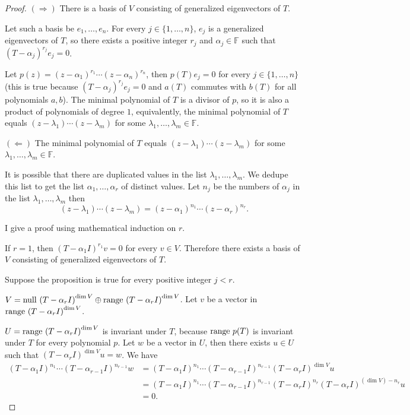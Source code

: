 \begin{proof}
    $(\Rightarrow)$ There is a basis of $V$ consisting of generalized eigenvectors of $T$.

    Let such a basis be $e_{1}, \ldots, e_{n}$. For every $j\in\{1,\ldots,n\}$, $e_{j}$ is a generalized eigenvectors of $T$, so there exists a positive integer $r_{j}$ and $\alpha_{j}\in\mathbb{F}$ such that ${(T - \alpha_{j})}^{r_{j}}e_{j} = 0$.

    Let $p(z) = {(z - \alpha_{1})}^{r_{1}}\cdots {(z - \alpha_{n})}^{r_{n}}$, then $p(T)e_{j} = 0$ for every $j\in\{ 1,\ldots, n \}$ (this is true because ${(T - \alpha_{j})}^{r_{j}}e_{j} = 0$ and $a(T)$ commutes with $b(T)$ for all polynomials $a, b$). The minimal polynomial of $T$ is a divisor of $p$, so it is also a product of polynomials of degree $1$, equivalently, the minimal polynomial of $T$ equals $(z - \lambda_{1})\cdots (z - \lambda_{m})$ for some $\lambda_{1}, \ldots, \lambda_{m}\in\mathbb{F}$.

    \bigskip
    $(\Leftarrow)$ The minimal polynomial of $T$ equals $(z - \lambda_{1})\cdots (z - \lambda_{m})$ for some $\lambda_{1}, \ldots, \lambda_{m}\in\mathbb{F}$.

    It is possible that there are duplicated values in the list $\lambda_{1}, \ldots, \lambda_{m}$. We dedupe this list to get the list $\alpha_{1}, \ldots, \alpha_{r}$ of distinct values. Let $n_{j}$ be the numbers of $\alpha_{j}$ in the list $\lambda_{1}, \ldots, \lambda_{m}$ then
    \[
        (z - \lambda_{1})\cdots (z - \lambda_{m}) = {(z - \alpha_{1})}^{n_{1}}\cdots {(z - \alpha_{r})}^{n_{r}}.
    \]

    I give a proof using mathematical induction on $r$.

    If $r = 1$, then ${(T - \alpha_{1}I)}^{r_{1}}v = 0$ for every $v\in V$. Therefore there exists a basis of $V$ consisting of generalized eigenvectors of $T$.

    Suppose the proposition is true for every positive integer $j < r$.

    $V = \operatorname{null}\,{{(T - \alpha_{r}I)}^{\dim V}}\oplus \operatorname{range}\,{{(T - \alpha_{r}I)}^{\dim V}}$. Let $v$ be a vector in $\operatorname{range}\,{{(T - \alpha_{r}I)}^{\dim V}}$.

    $U = \operatorname{range}\,{{(T - \alpha_{r}I)}^{\dim V}}$ is invariant under $T$, because $\operatorname{range}\,{p(T)}$ is invariant under $T$ for every polynomial $p$. Let $w$ be a vector in $U$, then there exists $u\in U$ such that ${(T - \alpha_{r}I)}^{\dim V}u = w$. We have
    \begin{align*}
        {(T - \alpha_{1}I)}^{n_{1}}\cdots {(T - \alpha_{r-1}I)}^{n_{r-1}}w & = {(T - \alpha_{1}I)}^{n_{1}}\cdots {(T - \alpha_{r-1}I)}^{n_{r-1}}{(T - \alpha_{r}I)}^{\dim V}u                                      \\
                                                                           & = {(T - \alpha_{1}I)}^{n_{1}}\cdots {(T - \alpha_{r-1}I)}^{n_{r-1}}{(T - \alpha_{r}I)}^{n_{r}}{(T - \alpha_{r}I)}^{(\dim V) - n_{r}}u \\
                                                                           & = 0.
    \end{align*}


\end{proof}
